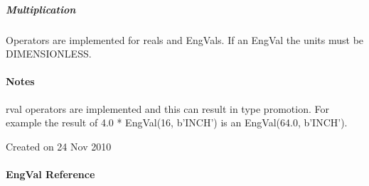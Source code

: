 \documentclass[letterpaper,10pt,english]{sphinxmanual}
\begin{document}
\subparagraph{Multiplication}
\label{\detokenize{ref/LIS/core/EngVal:multiplication}}
Operators \sphinxcode{*, *=} are implemented for reals and EngVals.
If an EngVal the units must be DIMENSIONLESS.


\paragraph{Notes}
\label{\detokenize{ref/LIS/core/EngVal:notes}}
rval operators are implemented and this can result in type promotion.
For example the result of 4.0 * EngVal(16, b’INCH’) is an EngVal(64.0, b’INCH’).

Created on 24 Nov 2010


\paragraph{EngVal Reference}
\label{\detokenize{ref/LIS/core/EngVal:engval-reference}}
\end{document}
